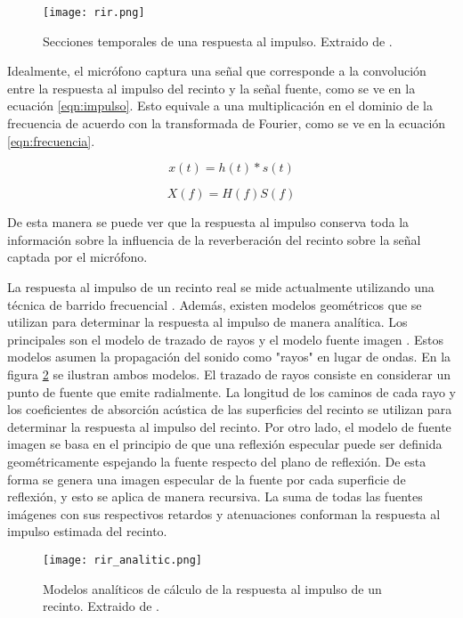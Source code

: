 \begin{figure}[H]
  \centering{}
  \texttt{[image: rir.png]}
  \caption{Secciones temporales de una respuesta al impulso. Extraido de \cite{rir}.}
  \label{fig:rir}
\end{figure}

Idealmente, el micrófono captura una señal que corresponde a la convolución entre la respuesta al impulso del recinto y la señal fuente, como se ve en la ecuación \ref{eqn:impulso}. Esto equivale a una multiplicación en el dominio de la frecuencia de acuerdo con la transformada de Fourier, como se ve en la ecuación \ref{eqn:frecuencia}.  


\begin{equation}
\label{eqn:impulso}
	x(t) = h(t) * s(t)
\end{equation} 

\begin{equation}
\label{eqn:frecuencia}
	X(f) = H(f)S(f)
\end{equation} 

De esta manera se puede ver que la respuesta al impulso conserva toda la información sobre la influencia de la reverberación del recinto sobre la señal captada por el micrófono. 

La respuesta al impulso de un recinto real se mide actualmente utilizando una técnica de barrido frecuencial \cite{sinesweep}. Además, existen modelos geométricos que se utilizan para determinar la respuesta al impulso de manera analítica. Los principales son el modelo de trazado de rayos \cite{raytracing} y el modelo fuente imagen \cite{sourceimage}. Estos modelos asumen la propagación del sonido como "rayos" en lugar de ondas. En la figura \ref{fig:analitic_rir} se ilustran ambos modelos. El trazado de rayos consiste en considerar un punto de fuente que emite radialmente. La longitud de los caminos de cada rayo y los coeficientes de absorción acústica de las superficies del recinto se utilizan para determinar la respuesta al impulso del recinto. Por otro lado, el modelo de fuente imagen se basa en el principio de que una reflexión especular puede ser definida geométricamente espejando la fuente respecto del plano de reflexión. De esta forma se genera una imagen especular de la fuente por cada superficie de reflexión, y esto se aplica de manera recursiva. La suma de todas las fuentes imágenes con sus respectivos retardos y atenuaciones conforman la respuesta al impulso estimada del recinto.

\begin{figure}[H]
  \centering{}
  \texttt{[image: rir\_analitic.png]}
  \caption{Modelos analíticos de cálculo de la respuesta al impulso de un recinto. Extraido de \cite{rir}.}
  \label{fig:analitic_rir}
\end{figure} 

